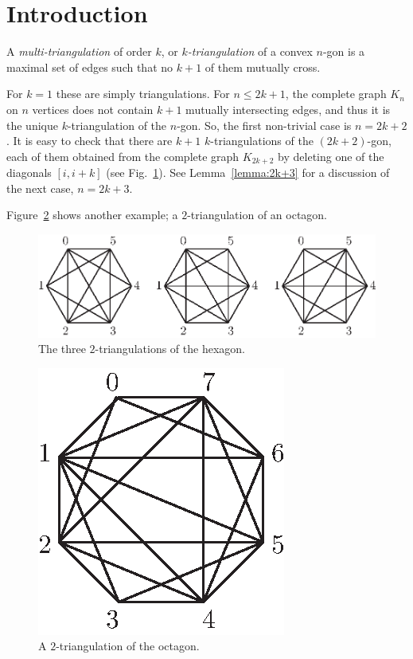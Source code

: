 \documentclass[12pt]{amsart}
\begin{document}
\section{Introduction}\label{sectionintroduction}

A \emph{multi-triangulation} of order $k$, or \emph{$k$-triangulation} of a convex $n$-gon is a maximal set of edges such that no $k+1$ of them mutually cross. 

\begin{example}
\rm
\label{exm:2k+2}
For $k=1$ these are simply triangulations. For $n\le 2k+1$, the complete graph $K_n$ on $n$ vertices does not contain $k+1$ mutually intersecting edges, and thus it is the unique $k$-triangulation of the $n$-gon. 
%
So, the first non-trivial case is $n=2k+2$. It is easy to check that there are $k+1$ $k$-triangulations of the $(2k+2)$-gon, each of them obtained from the complete graph $K_{2k+2}$ by deleting one of the diagonals $[i,i+k]$ (see Fig.~\ref{fig:2k+2}). See Lemma~\ref{lemma:2k+3} for a discussion of the next case, $n=2k+3$.

Figure~\ref{fig:2triang8points} shows another example; a $2$-triangulation of an octagon.
\end{example}

\begin{figure}
\centerline{\includegraphics[scale=1]{2k+2.eps}}
\caption{\small{The three $2$-triangulations of the hexagon.}}\label{fig:2k+2}
\end{figure}

\begin{figure}
\centerline{\includegraphics[scale=1]{2triang8points.eps}}
\caption{\small{A $2$-triangulation of the octagon.}}\label{fig:2triang8points}
\end{figure}
\end{document}
